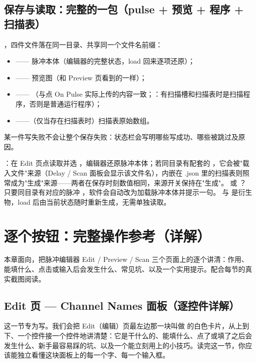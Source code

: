 \documentclass[11pt,oneside,openany]{book}
\begin{document}
\section{保存与读取：完整的一包（pulse + 预览 + 程序 + 扫描表）}
，四件文件落在同一目录、共享同一个文件名前缀：
\begin{itemize}
  \item {} —— 脉冲本体（编辑器的完整状态，load 回来逐项还原）；
  \item {} —— 预览图（和 Preview 页看到的一样）；
  \item {} —— （与点 On Pulse 实际上传的内容一致；：有扫描槽和扫描表时是扫描程序，否则是普通运行程序）；
  \item {} ——（仅当存在扫描表时）扫描表原始数组。
\end{itemize}
某一件写失败不会让整个保存失败：状态栏会写明哪些写成功、哪些被跳过及原因。

：在 Edit 页点读取并选 ，编辑器还原脉冲本体；若同目录有配套的 ，它会被"载入文件"来源（Delay / Scan 面板会显示该文件名），内嵌在 .json 里的扫描表则照常成为"生成"来源——两者在保存时刻数值相同，来源开关保持在"生成"。  或 ？只要同目录有对应的脉冲 ，软件会自动改为加载脉冲本体并提示一句。 与  是衍生物，load 后由当前状态随时重新生成，无需单独读取。

\chapter{逐个按钮：完整操作参考（详解）}

本章面向，把脉冲编辑器 Edit / Preview / Scan 三个页面上的逐个讲清：作用、能填什么、点击或输入后会发生什么、常见坑、以及一个实用提示。配合每节的真实截图阅读。

\section{Edit 页 — Channel Names 面板（逐控件详解）}

这一节专为写。我们会把 Edit（编辑）页最左边那一块叫做  的白色卡片，从上到下、一个控件接一个控件地讲清楚：它是干什么的、能填什么、点了或填了之后会发生什么、新手最容易踩的坑、以及一个能立刻用上的小技巧。读完这一节，你应该能独立看懂这块面板上的每一个字、每一个输入框。
\end{document}
